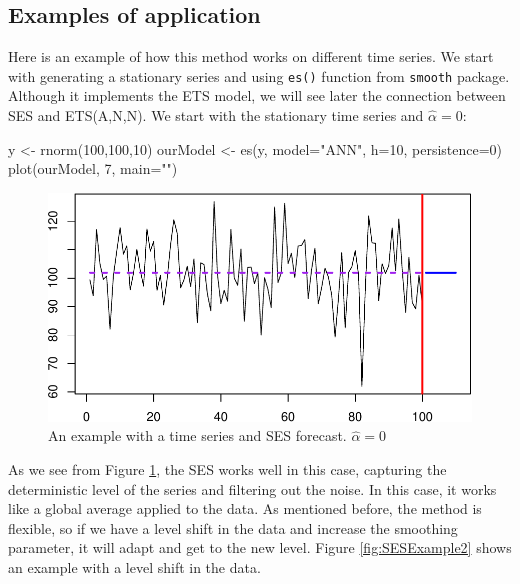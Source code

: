 \documentclass[
]{book}
\newenvironment{Shaded}{\begin{snugshade}}{\end{snugshade}}
\newcommand{\AttributeTok}[1]{\textcolor[rgb]{0.77,0.63,0.00}{#1}}
\newcommand{\DecValTok}[1]{\textcolor[rgb]{0.00,0.00,0.81}{#1}}
\newcommand{\FunctionTok}[1]{\textcolor[rgb]{0.00,0.00,0.00}{#1}}
\newcommand{\NormalTok}[1]{#1}
\newcommand{\OtherTok}[1]{\textcolor[rgb]{0.56,0.35,0.01}{#1}}
\newcommand{\StringTok}[1]{\textcolor[rgb]{0.31,0.60,0.02}{#1}}
\theoremstyle{definition}
\theoremstyle{definition}
\theoremstyle{definition}
\theoremstyle{definition}
\theoremstyle{remark}
\begin{document}
\hypertarget{examples-of-application}{%
\subsection{Examples of application}\label{examples-of-application}}

Here is an example of how this method works on different time series. We start with generating a stationary series and using \texttt{es()} function from \texttt{smooth} package. Although it implements the ETS model, we will see later the connection between SES and ETS(A,N,N). We start with the stationary time series and \(\hat{\alpha}=0\):

\begin{Shaded}
\begin{Highlighting}[]
\NormalTok{y }\OtherTok{\textless{}{-}} \FunctionTok{rnorm}\NormalTok{(}\DecValTok{100}\NormalTok{,}\DecValTok{100}\NormalTok{,}\DecValTok{10}\NormalTok{)}
\NormalTok{ourModel }\OtherTok{\textless{}{-}} \FunctionTok{es}\NormalTok{(y, }\AttributeTok{model=}\StringTok{"ANN"}\NormalTok{, }\AttributeTok{h=}\DecValTok{10}\NormalTok{, }\AttributeTok{persistence=}\DecValTok{0}\NormalTok{)}
\FunctionTok{plot}\NormalTok{(ourModel, }\DecValTok{7}\NormalTok{, }\AttributeTok{main=}\StringTok{""}\NormalTok{)}
\end{Highlighting}
\end{Shaded}

\begin{figure}
\centering
\includegraphics{Svetunkov--2022----ADAM_files/figure-latex/SESExample1-1.pdf}
\caption{\label{fig:SESExample1}An example with a time series and SES forecast. \(\hat{\alpha}=0\)}
\end{figure}

As we see from Figure \ref{fig:SESExample1}, the SES works well in this case, capturing the deterministic level of the series and filtering out the noise. In this case, it works like a global average applied to the data. As mentioned before, the method is flexible, so if we have a level shift in the data and increase the smoothing parameter, it will adapt and get to the new level. Figure \ref{fig:SESExample2} shows an example with a level shift in the data.
\end{document}
